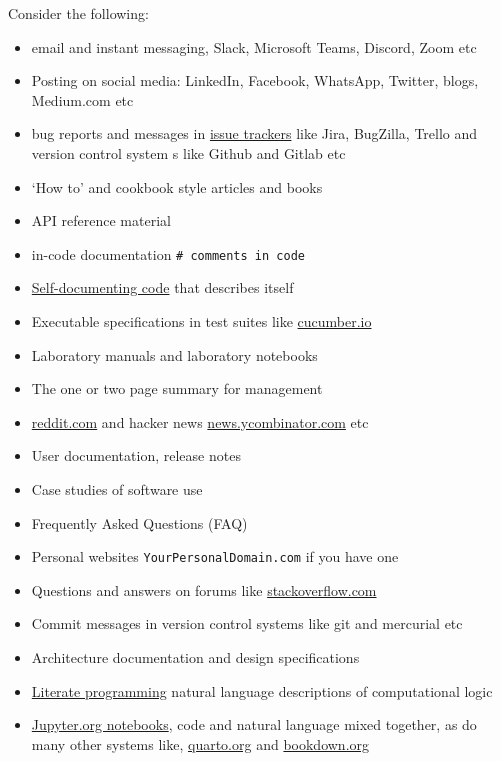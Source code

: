 \documentclass[
]{book}
\providecommand{\tightlist}{%
  \setlength{\itemsep}{0pt}\setlength{\parskip}{0pt}}
\begin{document}
Consider the following:

\begin{itemize}
\tightlist
\item
  email and instant messaging, Slack, Microsoft Teams, Discord, Zoom etc
\item
  Posting on social media: LinkedIn, Facebook, WhatsApp, Twitter, blogs, Medium.com etc
\item
  bug reports and messages in \href{https://en.wikipedia.org/wiki/Comparison_of_issue-tracking_systems}{issue trackers} like Jira, BugZilla, Trello and version control system s like Github and Gitlab etc
\item
  `How to' and cookbook style articles and books
\item
  API reference material
\item
  in-code documentation \texttt{\#\ comments\ in\ code}
\item
  \href{https://en.wikipedia.org/wiki/Self-documenting_code}{Self-documenting code} that describes itself
\item
  Executable specifications in test suites like \href{https://en.wikipedia.org/wiki/Cucumber_(software)}{cucumber.io}
\item
  Laboratory manuals and laboratory notebooks
\item
  The one or two page summary for management
\item
  \href{https://www.reddit.com/}{reddit.com} and hacker news \href{https://news.ycombinator.com/}{news.ycombinator.com} etc
\item
  User documentation, release notes
\item
  Case studies of software use
\item
  Frequently Asked Questions (FAQ)
\item
  Personal websites \texttt{YourPersonalDomain.com} if you have one
\item
  Questions and answers on forums like \href{https://stackoverflow.com/}{stackoverflow.com}
\item
  Commit messages in version control systems like git and mercurial etc
\item
  Architecture documentation and design specifications
\item
  \href{https://en.wikipedia.org/wiki/Literate_programming}{Literate programming} natural language descriptions of computational logic \citep{knuthlit}
\item
  \href{https://jupyter.org/}{Jupyter.org notebooks}, code and natural language mixed together, as do many other systems like, \href{https://quarto.org/}{quarto.org} and \href{https://bookdown.org/}{bookdown.org}
\end{itemize}
\end{document}
